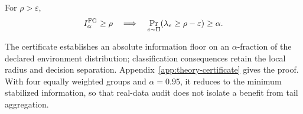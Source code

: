 \begin{proposition}
\label{prop:information-coverage}
For $\rho>\varepsilon$,
\begin{equation}
I_\alpha^{\mathrm{FG}}\ge\rho
\quad\Longrightarrow\quad
\Pr_{e\sim\Pi}(\lambda_e\ge\rho-\varepsilon)\ge\alpha.
\label{eq:information-coverage}
\end{equation}
\end{proposition}

The certificate establishes an absolute information floor on an $\alpha$-fraction of the declared environment distribution; classification consequences retain the local radius and decision separation. Appendix~\ref{app:theory-certificate} gives the proof. With four equally weighted groups and $\alpha=0.95$, it reduces to the minimum stabilized information, so that real-data audit does not isolate a benefit from tail aggregation.
